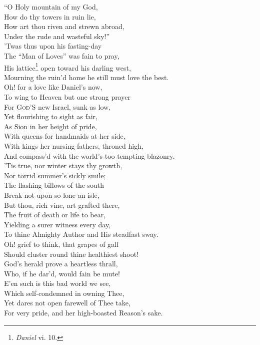 “O Holy mountain of my God, \\
 How do thy towers in ruin lie, \\
 How art thou riven and strewn abroad, \\
 Under the rude and wasteful sky!” \\
 ’Twas thus upon his fasting-day \\
 The “Man of Loves” was fain to pray, \\
 His lattice\footnote{\emph{Daniel} vi. 10.} open toward his darling west, \\
 Mourning the ruin’d home he still must love the best. \\
  Oh! for a love like Daniel’s now, \\
 To wing to Heaven but one strong prayer \\
 For \textsc{God}’S new Israel, sunk as low, \\
 Yet flourishing to sight as fair, \\
 As Sion in her height of pride, \\
 With queens for handmaids at her side, \\
 With kings her nursing-fathers, throned high, \\
 And compass’d with the world’s too tempting blazonry. \\
  ’Tis true, nor winter stays thy growth, \\
 Nor torrid summer’s sickly smile; \\
 The flashing billows of the south \\
 Break not upon so lone an isle, \\
 But thou, rich vine, art grafted there, \\
 The fruit of death or life to bear, \\
 Yielding a surer witness every day, \\
 To thine Almighty Author and His steadfast sway. \\
  Oh! grief to think, that grapes of gall \\
 Should cluster round thine healthiest shoot! \\
 God’s herald prove a heartless thrall, \\
 Who, if he dar’d, would fain be mute! \\
 E’en such is this bad world we see, \\
 Which self-condemned in owning Thee, \\
 Yet dares not open farewell of Thee take, \\
 For very pride, and her high-boasted Reason’s sake. \\

